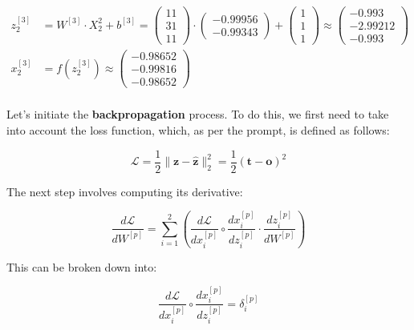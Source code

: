 \documentclass[12pt]{article}
\begin{document}
\begin{enumerate}[leftmargin=\labelsep]
          \begin{align*}
            z^{[3]}_2 &= {W}^{[3]} \cdot {X}^{2}_2 + {b}^{[3]} = \begin{pmatrix} 1 1 \\ 3 1 \\ 1 1\end{pmatrix} \cdot  \begin{pmatrix} -0.99956 \\ -0.99343\end{pmatrix} +
            \begin{pmatrix} 1 \\ 1 \\ 1\end{pmatrix} \approx \begin{pmatrix} -0.993 \\ -2.99212 \\ -0.993\end{pmatrix} \\
            {x}^{[3]}_2 &= f({z}^{[3]}_2) \approx \begin{pmatrix} -0.98652 \\ -0.99816 \\ -0.98652\end{pmatrix} \\
          \end{align*}

          Let's initiate the \textbf{backpropagation} process. To do this, we first need to take into account the loss function, which, as per the prompt, is defined as follows:

          \begin{equation}\label{ex2-loss}
            \mathcal{L} = \frac{1}{2} \|\mathbf{z} - \hat{\mathbf{z}}\|^{2}_{2} = \frac{1}{2} (\mathbf{t} - {\mathbf{o}})^{2}
          \end{equation}

          The next step involves computing its derivative:

          \begin{equation}
            \frac{d\mathcal{L}}{dW^{[p]}} = \sum_{i=1}^{2} (\frac{d\mathcal{L}}{dx^{[p]}_i} \circ \frac{dx^{[p]}_i}{dz^{[p]}_i} \cdot \frac{dz^{[p]}_i}{dW^{[p]}} )
          \end{equation}

          This can be broken down into:

          \begin{equation*}
            \frac{d\mathcal{L}}{dx^{[p]}_i} \circ \frac{dx^{[p]}_i}{dz^{[p]}_i} = \delta^{[p]}_i 
          \end{equation*}


\end{enumerate}
\end{document}
